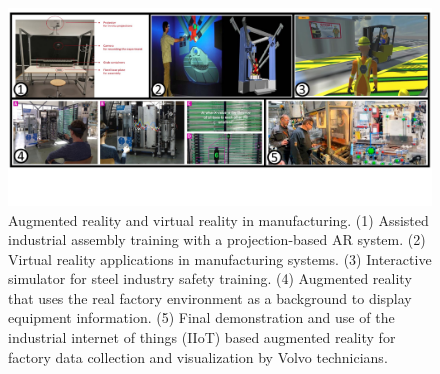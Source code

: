 \documentclass[a4paper,fleqn]{cas-dc}
\begin{document}
\begin{figure}
	\centering
	\includegraphics[width=\textwidth]{Images/imageandvideo2.pdf}
	\vspace{-5.5em}
	\caption{Augmented reality and virtual reality in manufacturing. (1) Assisted industrial assembly training with a projection-based AR system. (2) Virtual reality applications in manufacturing systems. (3) Interactive simulator for steel industry safety training. (4) Augmented reality that uses the real factory environment as a background to display equipment information. (5) Final demonstration and use of the industrial internet of things (IIoT) based augmented reality for factory data collection and visualization by Volvo technicians.}
	\label{fig:imageandvideo2}
	\vspace{-2em}
\end{figure}

\end{document}
